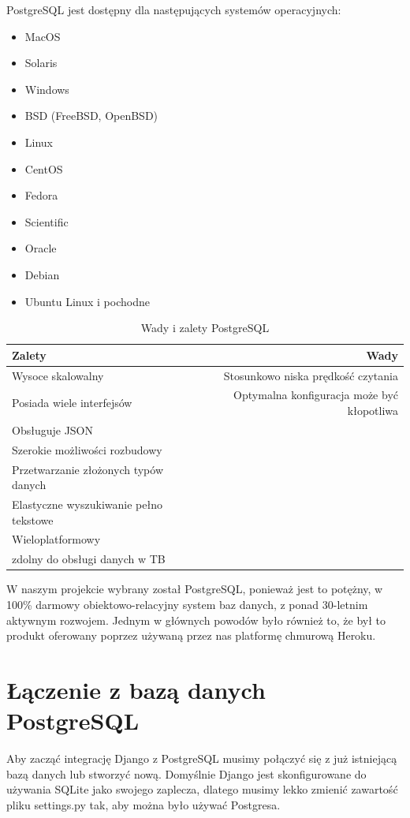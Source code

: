 \documentclass[oneside,polski,logo,indent]{amuthesis}
\begin{document}
\begin{enumerate}
\begin{enumerate}
PostgreSQL jest dostępny dla następujących systemów operacyjnych: 
\begin{itemize}
\item MacOS 
\item Solaris 
\item Windows 
\item BSD (FreeBSD, OpenBSD) 
\item Linux  
\item CentOS 
\item Fedora 
\item Scientific 
\item Oracle 
\item Debian 
\item Ubuntu Linux i pochodne 
\end{itemize}

\begin{table}[h!]
\caption{Wady i zalety PostgreSQL}
\label{tabela-PostgreSQL}
\centering
\begin{adjustbox}{width=1\textwidth}
\small
\begin{tabular}{|l|r|}
\toprule
Zalety & Wady\\
\midrule
Wysoce skalowalny & Stosunkowo niska prędkość czytania\\ 
Posiada wiele interfejsów & Optymalna konfiguracja może być kłopotliwa\\ 
Obsługuje JSON &  \\ 
Szerokie możliwości rozbudowy &  \\ 
Przetwarzanie złożonych typów danych &  \\ 
Elastyczne wyszukiwanie pełno tekstowe  &  \\ 
Wieloplatformowy &  \\ 
zdolny do obsługi danych w TB &  \\ 
\bottomrule
\end{tabular}
\end{adjustbox}
\end{table}
  

W naszym projekcie wybrany został PostgreSQL, ponieważ jest to potężny, w 100\% darmowy obiektowo-relacyjny system baz danych, z ponad 30-letnim aktywnym rozwojem. Jednym w głównych powodów było również to, że był to produkt oferowany poprzez używaną przez nas platformę chmurową Heroku. 
\section{Łączenie z bazą danych PostgreSQL}
Aby zacząć integrację Django z PostgreSQL musimy połączyć się z już istniejącą bazą danych lub stworzyć nową. 
Domyślnie Django jest skonfigurowane do używania SQLite jako swojego zaplecza, dlatego musimy lekko zmienić zawartość pliku settings.py tak, aby można było używać Postgresa. 


\end{enumerate}
\end{enumerate}
\end{document}

